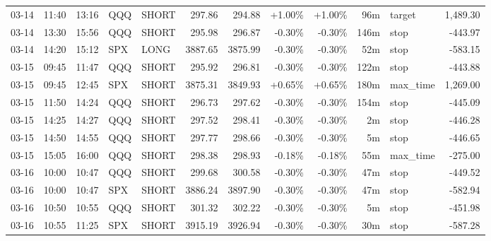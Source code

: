 \documentclass[11pt,a4paper]{article}
\begin{document}
\begin{center}
\begin{longtable}{>{\color{txtmain}}l l l l l r r r r r >{\color{txtmain}}l r}
03-14 & 11:40 & 13:16 & QQQ & SHORT & 297.86 & 294.88 & \textcolor{wingreen}{+1.00\%} & \textcolor{wingreen}{+1.00\%} & 96m & target & \textcolor{wingreen}{1,489.30} \\
03-14 & 13:30 & 15:56 & QQQ & SHORT & 295.98 & 296.87 & \textcolor{lossred}{-0.30\%} & \textcolor{lossred}{-0.30\%} & 146m & stop & \textcolor{lossred}{-443.97} \\
03-14 & 14:20 & 15:12 & SPX & LONG & 3887.65 & 3875.99 & \textcolor{lossred}{-0.30\%} & \textcolor{lossred}{-0.30\%} & 52m & stop & \textcolor{lossred}{-583.15} \\
03-15 & 09:45 & 11:47 & QQQ & SHORT & 295.92 & 296.81 & \textcolor{lossred}{-0.30\%} & \textcolor{lossred}{-0.30\%} & 122m & stop & \textcolor{lossred}{-443.88} \\
03-15 & 09:45 & 12:45 & SPX & SHORT & 3875.31 & 3849.93 & \textcolor{wingreen}{+0.65\%} & \textcolor{wingreen}{+0.65\%} & 180m & max\_time & \textcolor{wingreen}{1,269.00} \\
03-15 & 11:50 & 14:24 & QQQ & SHORT & 296.73 & 297.62 & \textcolor{lossred}{-0.30\%} & \textcolor{lossred}{-0.30\%} & 154m & stop & \textcolor{lossred}{-445.09} \\
03-15 & 14:25 & 14:27 & QQQ & SHORT & 297.52 & 298.41 & \textcolor{lossred}{-0.30\%} & \textcolor{lossred}{-0.30\%} & 2m & stop & \textcolor{lossred}{-446.28} \\
03-15 & 14:50 & 14:55 & QQQ & SHORT & 297.77 & 298.66 & \textcolor{lossred}{-0.30\%} & \textcolor{lossred}{-0.30\%} & 5m & stop & \textcolor{lossred}{-446.65} \\
03-15 & 15:05 & 16:00 & QQQ & SHORT & 298.38 & 298.93 & \textcolor{lossred}{-0.18\%} & \textcolor{lossred}{-0.18\%} & 55m & max\_time & \textcolor{lossred}{-275.00} \\
03-16 & 10:00 & 10:47 & QQQ & SHORT & 299.68 & 300.58 & \textcolor{lossred}{-0.30\%} & \textcolor{lossred}{-0.30\%} & 47m & stop & \textcolor{lossred}{-449.52} \\
03-16 & 10:00 & 10:47 & SPX & SHORT & 3886.24 & 3897.90 & \textcolor{lossred}{-0.30\%} & \textcolor{lossred}{-0.30\%} & 47m & stop & \textcolor{lossred}{-582.94} \\
03-16 & 10:50 & 10:55 & QQQ & SHORT & 301.32 & 302.22 & \textcolor{lossred}{-0.30\%} & \textcolor{lossred}{-0.30\%} & 5m & stop & \textcolor{lossred}{-451.98} \\
03-16 & 10:55 & 11:25 & SPX & SHORT & 3915.19 & 3926.94 & \textcolor{lossred}{-0.30\%} & \textcolor{lossred}{-0.30\%} & 30m & stop & \textcolor{lossred}{-587.28} \\

\end{longtable}
\end{center}
\end{document}
